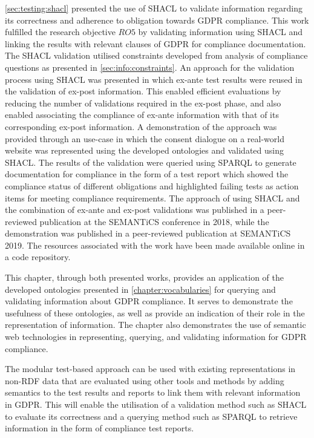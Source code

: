 \autoref{sec:testing:shacl} presented the use of SHACL to validate information regarding its correctness and adherence to obligation towards GDPR compliance.
This work fulfilled the research objective $RO5$ by validating information using SHACL and linking the results with relevant clauses of GDPR for compliance documentation.
The SHACL validation utilised constraints developed from analysis of compliance questions as presented in \autoref{sec:info:constraints}.
An approach for the validation process using SHACL was presented in which ex-ante test results were reused in the validation of ex-post information. This enabled efficient evaluations by reducing the number of validations required in the ex-post phase, and also enabled associating the compliance of ex-ante information with that of its corresponding ex-post information.
A demonstration of the approach was provided through an use-case in which the consent dialogue on a real-world website was represented using the developed ontologies and validated using SHACL.
The results of the validation were queried using SPARQL to generate documentation for compliance in the form of a test report which showed the compliance status of different obligations and highlighted failing tests as action items for meeting compliance requirements.
The approach of using SHACL and the combination of ex-ante and ex-post validations was published in a peer-reviewed publication \cite{pandit_towards_2018} at the SEMANTiCS conference in 2018, while the demonstration was published in a peer-reviewed publication \cite{pandit_test-driven_2019} at SEMANTiCS 2019.
The resources associated with the work have been made available online in a code repository.

This chapter, through both presented works, provides an application of the developed ontologies presented in \autoref{chapter:vocabularies} for querying and validating information about GDPR compliance.
It serves to demonstrate the usefulness of these ontologies, as well as provide an indication of their role in the representation of information.
The chapter also demonstrates the use of semantic web technologies in representing, querying, and validating information for GDPR compliance.

The modular test-based approach can be used with existing representations in non-RDF data that are evaluated using other tools and methods by adding semantics to the test results and reports to link them with relevant information in GDPR. This will enable the utilisation of a validation method such as SHACL to evaluate its correctness and a querying method such as SPARQL to retrieve information in the form of compliance test reports. 

